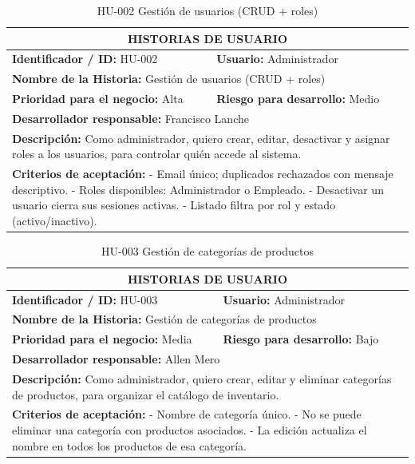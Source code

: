 \documentclass[12pt, letterpaper]{report}
\begin{document}
\begin{table}[H]
\centering
\caption{HU-002 Gestión de usuarios (CRUD + roles)}
\begin{tabularx}{\textwidth}{|X X|}
\hline
\multicolumn{2}{|c|}{\textbf{HISTORIAS DE USUARIO}} \\ \hline
\textbf{Identificador / ID:} HU-002 & \textbf{Usuario:} Administrador \\ \hline
\multicolumn{2}{|l|}{\textbf{Nombre de la Historia:} Gestión de usuarios (CRUD + roles)} \\ \hline
\textbf{Prioridad para el negocio:} Alta & \textbf{Riesgo para desarrollo:} Medio \\ \hline
\multicolumn{2}{|l|}{\textbf{Desarrollador responsable:} Francisco Lanche} \\ \hline
\multicolumn{2}{|p{0.95\textwidth}|}{\textbf{Descripción:} Como administrador, quiero crear, editar, desactivar y asignar roles a los usuarios, para controlar quién accede al sistema.} \\ \hline
\multicolumn{2}{|p{0.95\textwidth}|}{\textbf{Criterios de aceptación:} \newline
- Email único; duplicados rechazados con mensaje descriptivo. \newline
- Roles disponibles: Administrador o Empleado. \newline
- Desactivar un usuario cierra sus sesiones activas. \newline
- Listado filtra por rol y estado (activo/inactivo).} \\ \hline
\end{tabularx}
\end{table}

\begin{table}[H]
\centering
\caption{HU-003 Gestión de categorías de productos}
\begin{tabularx}{\textwidth}{|X X|}
\hline
\multicolumn{2}{|c|}{\textbf{HISTORIAS DE USUARIO}} \\ \hline
\textbf{Identificador / ID:} HU-003 & \textbf{Usuario:} Administrador \\ \hline
\multicolumn{2}{|l|}{\textbf{Nombre de la Historia:} Gestión de categorías de productos} \\ \hline
\textbf{Prioridad para el negocio:} Media & \textbf{Riesgo para desarrollo:} Bajo \\ \hline
\multicolumn{2}{|l|}{\textbf{Desarrollador responsable:} Allen Mero} \\ \hline
\multicolumn{2}{|p{0.95\textwidth}|}{\textbf{Descripción:} Como administrador, quiero crear, editar y eliminar categorías de productos, para organizar el catálogo de inventario.} \\ \hline
\multicolumn{2}{|p{0.95\textwidth}|}{\textbf{Criterios de aceptación:} \newline
- Nombre de categoría único. \newline
- No se puede eliminar una categoría con productos asociados. \newline
- La edición actualiza el nombre en todos los productos de esa categoría.} \\ \hline
\end{tabularx}
\end{table}
\end{document}
